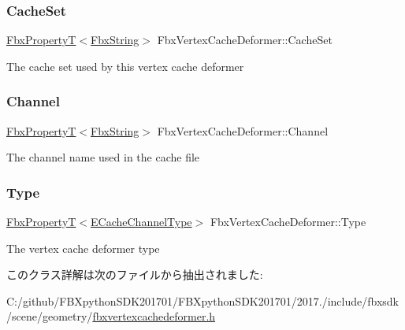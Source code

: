 \subsubsection{\texorpdfstring{Cache\+Set}{CacheSet}}
{\footnotesize\ttfamily \hyperlink{class_fbx_property_t}{Fbx\+PropertyT}$<$\hyperlink{class_fbx_string}{Fbx\+String}$>$ Fbx\+Vertex\+Cache\+Deformer\+::\+Cache\+Set}



The cache set used by this vertex cache deformer 

\mbox{\label{class_fbx_vertex_cache_deformer_a70c66f374f95dd42c0ee91077b04cb42}} 
\subsubsection{\texorpdfstring{Channel}{Channel}}
{\footnotesize\ttfamily \hyperlink{class_fbx_property_t}{Fbx\+PropertyT}$<$\hyperlink{class_fbx_string}{Fbx\+String}$>$ Fbx\+Vertex\+Cache\+Deformer\+::\+Channel}



The channel name used in the cache file 

\mbox{\label{class_fbx_vertex_cache_deformer_a48db6d058d753fdfa14400a3f39d2260}} 
\subsubsection{\texorpdfstring{Type}{Type}}
{\footnotesize\ttfamily \hyperlink{class_fbx_property_t}{Fbx\+PropertyT}$<$\hyperlink{class_fbx_vertex_cache_deformer_a24f0c46d4f47717615852a8e7346efed}{E\+Cache\+Channel\+Type}$>$ Fbx\+Vertex\+Cache\+Deformer\+::\+Type}



The vertex cache deformer type 



このクラス詳解は次のファイルから抽出されました\+:\begin{DoxyCompactItemize}
\item 
C\+:/github/\+F\+B\+Xpython\+S\+D\+K201701/\+F\+B\+Xpython\+S\+D\+K201701/2017./include/fbxsdk/scene/geometry/\hyperlink{fbxvertexcachedeformer_8h}{fbxvertexcachedeformer.\+h}\end{DoxyCompactItemize}
